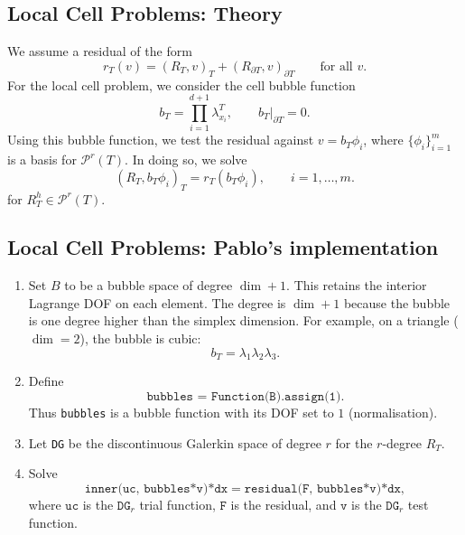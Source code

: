 \documentclass[12pt,a4paper]{article}
\newcommand{\PP}{\mathcal{P}}
\begin{document}
\subsection{Local Cell Problems: Theory}
We assume a residual of the form
\begin{equation}
    r_T(v)=(R_T,v)_T+(R_{\partial T},v)_{\partial T}
    \qquad\text{for all }v.
\end{equation}
For the local cell problem, we consider the cell bubble function
\begin{equation}
    b_T=\prod_{i=1}^{d+1}\lambda_{x_i}^{T},
    \qquad b_T|_{\partial T}=0.
\end{equation}
Using this bubble function, we test the residual against $v=b_T\phi_i$, where $\{\phi_i\}_{i=1}^m$ is a basis for $\PP^r(T).$ In doing so, we solve
\begin{equation}
    (R_T,b_T\phi_i)_T=r_T(b_T\phi_i),
    \qquad i=1,\ldots,m.
\end{equation}
for $R_T^h \in \PP^r(T).$

\subsection{Local Cell Problems: Pablo's implementation}
\begin{enumerate}[label=\roman*)]
    \item Set $B$ to be a bubble space of degree $\dim+1$.
    This retains the interior Lagrange DOF on each element. The degree is $\dim+1$ because the bubble is one degree higher than the simplex dimension. For example, on a triangle ($\dim=2$), the bubble is cubic:
    \begin{equation}
        b_T = \lambda_1\lambda_2\lambda_3.
    \end{equation}

    \item Define
    \begin{equation}
        \texttt{bubbles = Function(B).assign(1)}.
    \end{equation}
    Thus \texttt{bubbles} is a bubble function with its DOF set to $1$ (normalisation).

    \item Let \texttt{DG} be the discontinuous Galerkin space of degree $r$ for the $r$-degree $R_T$.

    \item Solve
    \begin{equation}
        \texttt{inner(uc, bubbles*v)*dx}
        =\texttt{residual(F, bubbles*v)*dx},
    \end{equation}
    where $\texttt{uc}$ is the $\texttt{DG}_r$ trial function, $\texttt{F}$ is the residual, and $\texttt{v}$ is the $\texttt{DG}_r$ test function.
\end{enumerate}
\end{document}
